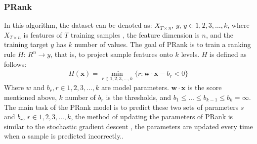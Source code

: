 \subsubsection{PRank}
In this algorithm, the dataset can be denoted as: $X_{T\times n}$, $y$, $y\in {1, 2, 3, \dots, k}$, where $X_{T\times n}$ is features of $ T $ training samples , the feature dimension is $ n $, and the training target $ y $ has $k$ number of values.
The goal of PRank is to train a ranking rule $H$: $ R ^ n \rightarrow y$, that is, to project sample features onto $ k $ levels. 
$ H $ is defined as follows: 
\begin{equation}
\begin{aligned}
H(\mathbf x)=\min_{r \in {1, 2, 3, \dots, k}}\{r: \mathbf w \cdot \mathbf x - b_r < 0\}
\end{aligned}
\label{eqn:eq2}
\end{equation}
 Where $ w $ and $b_r, r \in {1, 2, 3, \dots, k}$ are model parameters. $\mathbf w \cdot \mathbf x$ is the score mentioned above, $ k $ number of $b_r$ is the thresholds, and $b_1 \le \dots \le b_ {k-1} \le b_k = \infty$. The main task of the PRank model is to predict these two sets of parameters $ s $ and $b_r$, $r \in {1, 2, 3, \dots, k}$, the method of updating the parameters of PRank is similar to the stochastic gradient descent , the parameters are updated every time when a sample is predicted incorrectly..

